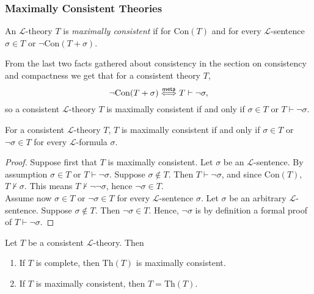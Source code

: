 \subsubsection{Maximally Consistent Theories}
\begin{definition}
    An $\mathcal{L}$-theory $T$ is \emph{maximally consistent} if for $\mathrm{Con}(T)$ and for every $\mathcal{L}$-sentence $\sigma\in T$ or $\neg\mathrm{Con}(T+\sigma)$. 
\end{definition}
\begin{remark}\label{ConsistentTheoryIsInconsistentUponBeingExtendedByOneFormulaIffItCanProveSaidTheory}
    From the last two facts gathered about consistency in the section on consistency and compactness we get that for a consistent theory $T$,
    $$\neg\mathrm{Con}(T+\sigma)\mathrel{\overset{\mathsf{meta}}{\Longleftrightarrow}} T\vdash \neg \sigma,$$
    so a consistent $\mathcal{L}$-theory $T$ is maximally consistent if and only if $\sigma\in T$ or $T\vdash \neg\sigma$. 
\end{remark}
\begin{lemma}
    For a consistent $\mathcal{L}$-theory $T$, $T$ is maximally consistent if and only if $\sigma \in T$ or $\neg\sigma\in T$ for every $\mathcal{L}$-formula $\sigma$.
\end{lemma}
\begin{proof}
    Suppose first that $T$ is maximally consistent. Let $\sigma$ be an $\mathcal{L}$-sentence. By assumption $\sigma\in T$ or $T\vdash \neg \sigma$. Suppose $\sigma\notin T$. Then $T\vdash \neg \sigma$, and since $\mathrm{Con}(T)$, $T\not\vdash \sigma$. This means $T\not\vdash \neg\neg\sigma$, hence $\neg\sigma\in T$.\\
    Assume now $\sigma\in T$ or $\neg\sigma\in T$ for every $\mathcal{L}$-sentence $\sigma$. Let $\sigma$ be an arbitrary $\mathcal{L}$-sentence. Suppose $\sigma\notin T$. Then $\neg \sigma\in T$. Hence, $\neg \sigma$ is by definition a formal proof of $T\vdash \neg\sigma$.  
\end{proof}
\begin{lemma}
    Let $T$ be a consistent $\mathcal{L}$-theory. Then 
    \begin{enumerate}
        \item If $T$ is complete, then $\mathrm{Th}(T)$ is maximally consistent.
        \item If $T$ is maximally consistent, then $T=\mathrm{Th}(T)$. 
    \end{enumerate}
\end{lemma}
